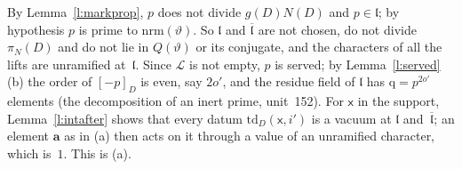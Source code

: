\documentclass[11pt,a4paper]{article}
\makeatletter
\theoremstyle{plainx}
\theoremstyle{uprightx}
\renewenvironment{proof}[1][Proof]{\par\pushQED{\qed}\normalfont\topsep0pt\partopsep0pt
  \trivlist\item[\hskip\labelsep\itshape #1.]\ignorespaces}{\popQED\endtrivlist\@endpefalse}
\newcommand{\cj}[1]{\overline{#1}}
\newcommand{\pin}[2]{[#2]_{#1}}
\newcommand{\ND}[1]{N(#1)}
\newcommand{\piN}[1]{\pi_N(#1)}
\newcommand{\gD}[1]{g(#1)}
\newcommand{\td}[3]{\mathrm{td}_{#1}(#2,#3)}
\newcommand{\nrm}[1]{\mathrm{nrm}(#1)}
\makeatother
\begin{document}
\begin{proof}
By Lemma~\ref{l:markprop}, $p$ does not divide $\gD{D}\ND{D}$ and $p\in\mathfrak{l}$; by hypothesis $p$ is prime
to $\nrm{\vartheta}$. So $\mathfrak{l}$ and $\cj{\mathfrak{l}}$ are not chosen, do not divide $\piN{D}$ and do not
lie in $Q(\vartheta)$ or its conjugate, and the characters of all the lifts are unramified at~$\mathfrak{l}$.
Since $\mathcal{L}$ is not empty, $p$ is served; by Lemma~\ref{l:served}(b) the order of $\pin{D}{-p}$ is even,
say $2o'$, and the residue field of $\mathfrak{l}$ has $\mathrm{q}=p^{2o'}$ elements (the decomposition of an inert
prime, unit~152). For $\mathsf{x}$ in the support, Lemma~\ref{l:intafter} shows that every datum
$\td{D}{\mathsf{x}}{i'}$ is a vacuum at $\mathfrak{l}$ and~$\cj{\mathfrak{l}}$; an element $\mathbf{a}$ as in (a) then
acts on it through a value of an unramified character, which is~$1$. This is (a).


\end{proof}
\end{document}
